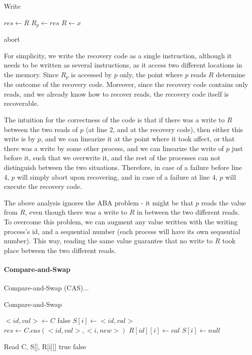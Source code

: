 \documentclass{article}
\begin{document}
\begin{algorithm}
	\caption{Write}\label{euclid}
	\begin{algorithmic}[1]
		\State $res \gets R$
		\State $R_{p} \gets res$
		\State $R \gets x$
		\EndProcedure
		
		 \Return abort
		\EndIf
		\EndProcedure
	\end{algorithmic}
\end{algorithm}

For simplicity, we write the recovery code as a single instruction, although it needs to be written as several instructions, as it access two different locations in the memory. Since $R_p$ is accessed by $p$ only, the point where $p$ reads $R$ determine the outcome of the recovery code. Moreover, since the recovery code contains only reads, and we already know how to recover reads, the recovery code itself is recoverable.

The intuition for the correctness of the code is that if there was a write to $R$ between the two reads of $p$ (at line 2, and at the recovery code), then either this write is by $p$, and we can linearize it at the point where it took affect, or that there was a write by some other process, and we can linearize the write of $p$ just before it, such that we overwrite it, and the rest of the processes can not distinguish between the two situations. Therefore, in case of a failure before line 4, $p$ will simply abort upon recovering, and in case of a failure at line 4, $p$ will execute the recovery code.

The above analysis ignores the ABA problem - it might be that $p$ reads the value from $R$, even though there was a write to $R$ in between the two different reads. To overcome this problem, we can augment any value written with the writing process's id, and a sequential number (each process will have its own sequential number). This way, reading the same value guarantee that no write to $R$ took place between the two different reads.


\paragraph*{Compare-and-Swap}

Compare-and-Swap (CAS)...

\begin{algorithm}
	\caption{Compare-and-Swap}\label{euclid}
	\begin{algorithmic}[1]
		\State $<id,val> \gets C$
		\State \Return false
		\EndIf
		\State $S[i] \gets <id,val>$
		\State $res \gets C.cas(<id,val>, <i,new>)$
		\State $R[id][i] \gets val$
		\EndIf
		\State $S[i] \gets null$
		\EndProcedure
		
		\State Read C, S[], R[i][]
		\State \Return true
		\Else {}
		\State \Return false
		\EndIf
		\EndProcedure
	\end{algorithmic}
\end{algorithm}
\end{document}
